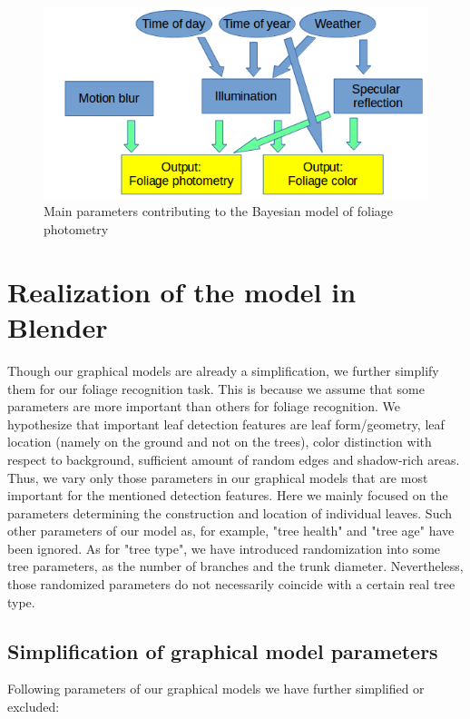 \documentclass[fleqn,10pt]{SelfArx} %
\begin{document}
\begin{figure}[ht]\centering
\includegraphics[width=\linewidth]{Figures/foliagePhotometry.png}
\caption{Main parameters contributing to the Bayesian model of foliage photometry}
\label{fig:foliagePhotometry}
\end{figure}

\section{Realization of the model in Blender}

Though our graphical models are already a simplification, we further simplify them for our foliage recognition task. This is because we assume that some parameters are more important than others for foliage recognition. We hypothesize that important leaf detection features are leaf form/geometry, leaf location (namely on the ground and not on the trees), color distinction with respect to background, sufficient amount of random edges and shadow-rich areas. Thus, we vary only those parameters in our graphical models that are most important for the mentioned detection features. Here we mainly focused on the parameters determining the construction and location of individual leaves. Such other parameters of our model as, for example, "tree health" and "tree age" have been ignored. As for "tree type", we have introduced randomization into some tree parameters, as the number of branches and the trunk diameter. Nevertheless, those randomized parameters do not necessarily coincide with a certain real tree type. 

\subsection{Simplification of graphical model parameters}

Following parameters of our graphical models we have further simplified or excluded:
 
\end{document}
